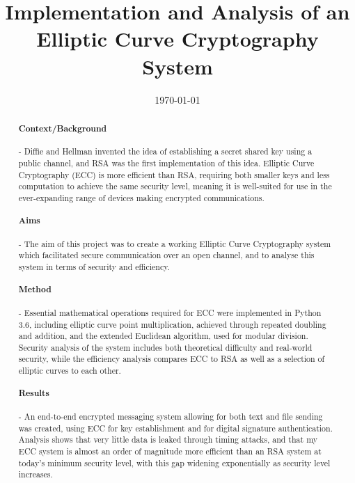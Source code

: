 \documentclass[12pt,a4paper]{article}
\title{Implementation and Analysis of an Elliptic Curve Cryptography System}
\date{\today}
\begin{document}
\maketitle

\begin{abstract}

    \vspace{-5mm}
    \paragraph{Context/Background} -
    Diffie and Hellman invented the idea of establishing a secret shared key using a public channel, and 
    RSA was the first implementation of this idea. 
    Elliptic Curve Cryptography (ECC) is more efficient than RSA, requiring both smaller keys and less computation to achieve the same security level, meaning it is well-suited for use in the ever-expanding range of devices making encrypted communications. 
    
    \vspace{-5mm}
    \paragraph{Aims} -
    The aim of this project was to create a working Elliptic Curve Cryptography system which facilitated secure communication over an open channel, 
    and to analyse this system in terms of security and efficiency. 

    \vspace{-5mm}
    \paragraph{Method} -
    Essential mathematical operations required for ECC were implemented in Python 3.6, including elliptic curve point multiplication, achieved through repeated doubling and addition, and the extended Euclidean algorithm, used for modular division. 
    Security analysis of the system includes both theoretical difficulty and real-world security, 
    while the efficiency analysis compares ECC to RSA as well as a selection of elliptic curves to each other. 

    \vspace{-5mm}
    \paragraph{Results} -
    An end-to-end encrypted messaging system allowing for both text and file sending was created, using ECC for key establishment and for digital signature authentication. 
    Analysis shows that very little data is leaked through timing attacks, and that my ECC system is almost an order of magnitude more efficient than an RSA system at today's minimum security level, with this gap widening exponentially as security level increases. 


\end{abstract}
\end{document}
